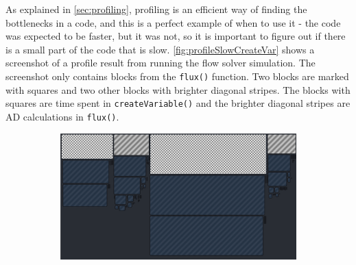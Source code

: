 As explained in \autoref{sec:profiling}, profiling is an efficient way of finding the bottlenecks in a code, and this is a perfect example of when to use it - the code was expected to be faster, but it was not, so it is important to figure out if there is a small part of the code that is slow. \autoref{fig:profileSlowCreateVar} shows a screenshot of a profile result from running the flow solver simulation. The screenshot only contains blocks from the \texttt{flux()} function. Two blocks are marked with squares and two other blocks with brighter diagonal stripes. The blocks with squares are time spent in \texttt{createVariable()} and the brighter diagonal stripes are AD calculations in \texttt{flux()}.
\begin{figure}[H]
    \centering
    \begin{subfigure}[t]{0.75\textwidth}
        \includegraphics[height = 0.35\textheight, width=\textwidth ]{figures/profilingSlowCreateVariablesFlux.png}
        \caption{}
        \label{fig:profileSlowCreateVar}
    \end{subfigure}
    \hspace{0.06\textwidth}
    \begin{subfigure}[t]{0.18\textwidth}

\end{subfigure}
\end{figure}
